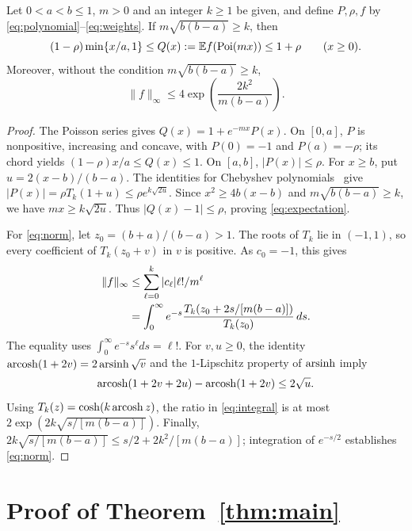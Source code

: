 \begin{lemma}\label{lem:weights}
Let $0<a<b\le1$, $m>0$ and an integer $k\ge1$ be given, and define $P,\rho,f$ by
\eqref{eq:polynomial}--\eqref{eq:weights}. If $m\sqrt{b(b-a)}\ge k$, then
\begin{equation}
 (1-\rho)\min\{x/a,1\}
 \le Q(x):=\mathbb E f(\operatorname{Poi}(mx))\le1+\rho\qquad(x\ge0).
 \label{eq:expectation}
\end{equation}
Moreover, without the condition $m\sqrt{b(b-a)}\ge k$,
\begin{equation}
 \|f\|_\infty\le4\exp\!\left(\frac{2k^2}{m(b-a)}\right).
 \label{eq:norm}
\end{equation}
\end{lemma}
\begin{proof}
The Poisson series gives $Q(x)=1+e^{-mx}P(x)$. On $[0,a]$, $P$ is
nonpositive, increasing and concave, with $P(0)=-1$ and $P(a)=-\rho$;
its chord yields $(1-\rho)x/a\le Q(x)\le1$. On $[a,b]$, $|P(x)|\le\rho$.
For $x\ge b$, put $u=2(x-b)/(b-a)$. The identities for Chebyshev
polynomials~\cite[Section~18.5]{dlmf} give
$|P(x)|=\rho T_k(1+u)\le\rho e^{k\sqrt{2u}}$.
Since $x^2\ge4b(x-b)$ and $m\sqrt{b(b-a)}\ge k$, we have
$mx\ge k\sqrt{2u}$. Thus $|Q(x)-1|\le\rho$, proving
\eqref{eq:expectation}.

For \eqref{eq:norm}, let $z_0=(b+a)/(b-a)>1$. The roots of $T_k$ lie
in $(-1,1)$, so every coefficient of $T_k(z_0+v)$ in $v$ is positive.
As $c_0=-1$, this gives
\begin{align}
 \|f\|_\infty
 &\le \sum_{\ell=0}^k |c_\ell|\ell!/m^\ell\notag\\
 &=\int_0^\infty e^{-s}
 \frac{T_k(z_0+2s/[m(b-a)])}{T_k(z_0)}\,ds.
 \label{eq:integral}
\end{align}
The equality uses $\int_0^\infty e^{-s}s^\ell ds=\ell!$.
For $v,u\ge0$, the identity
$\operatorname{arcosh}(1+2v)=2\operatorname{arsinh}\sqrt v$ and the $1$-Lipschitz property of
$\operatorname{arsinh}$ imply
\[
 \operatorname{arcosh}(1+2v+2u)-\operatorname{arcosh}(1+2v)\le2\sqrt u.
\]
Using $T_k(z)=\cosh(k\operatorname{arcosh} z)$, the ratio in \eqref{eq:integral} is
at most $2\exp(2k\sqrt{s/[m(b-a)]})$. Finally,
$2k\sqrt{s/[m(b-a)]}\le s/2+2k^2/[m(b-a)]$; integration of $e^{-s/2}$
establishes \eqref{eq:norm}.
\end{proof}

\section{Proof of Theorem~\ref{thm:main}}

